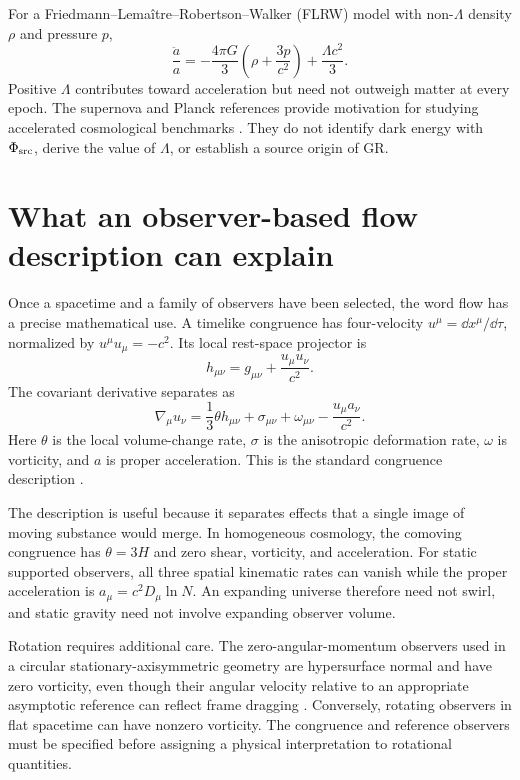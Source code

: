 \documentclass[11pt]{article}
\begin{document}
For a Friedmann--Lema\^itre--Robertson--Walker (FLRW) model with non-$\Lambda$ density $\rho$ and pressure $p$,
\begin{equation}
\frac{\ddot a}{a}=-\frac{4\pi G}{3}\left(\rho+\frac{3p}{c^2}\right)
+\frac{\Lambda c^2}{3}.
\end{equation}
Positive $\Lambda$ contributes toward acceleration but need not outweigh matter at every epoch. The supernova and Planck references provide motivation for studying accelerated cosmological benchmarks \parencite{Riess1998,Perlmutter1999,Planck2018Parameters}. They do not identify dark energy with $\Phi_{\mathrm{src}}$, derive the value of $\Lambda$, or establish a source origin of GR.

\section{What an observer-based flow description can explain}
Once a spacetime and a family of observers have been selected, the word flow has a precise mathematical use. A timelike congruence has four-velocity $u^\mu=\dd x^\mu/\dd\tau$, normalized by $u^\mu u_\mu=-c^2$. Its local rest-space projector is
\begin{equation}
h_{\mu\nu}=g_{\mu\nu}+\frac{u_\mu u_\nu}{c^2}.
\end{equation}
The covariant derivative separates as
\begin{equation}
\nabla_\mu u_\nu=\frac13\theta h_{\mu\nu}+\sigma_{\mu\nu}
+\omega_{\mu\nu}-\frac{u_\mu a_\nu}{c^2}.
\end{equation}
Here $\theta$ is the local volume-change rate, $\sigma$ is the anisotropic deformation rate, $\omega$ is vorticity, and $a$ is proper acceleration. This is the standard congruence description \parencite{EllisVanElst1999}.

The description is useful because it separates effects that a single image of moving substance would merge. In homogeneous cosmology, the comoving congruence has $\theta=3H$ and zero shear, vorticity, and acceleration. For static supported observers, all three spatial kinematic rates can vanish while the proper acceleration is $a_\mu=c^2D_\mu\ln N$. An expanding universe therefore need not swirl, and static gravity need not involve expanding observer volume.

Rotation requires additional care. The zero-angular-momentum observers used in a circular stationary-axisymmetric geometry are hypersurface normal and have zero vorticity, even though their angular velocity relative to an appropriate asymptotic reference can reflect frame dragging \parencite{Gourgoulhon2010}. Conversely, rotating observers in flat spacetime can have nonzero vorticity. The congruence and reference observers must be specified before assigning a physical interpretation to rotational quantities.
\end{document}
